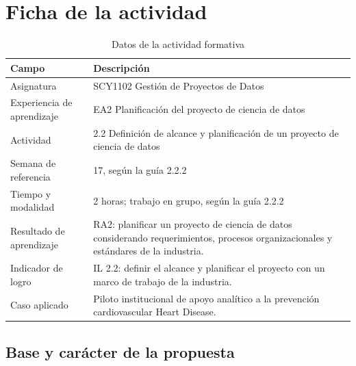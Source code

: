 \documentclass[12pt,a4paper]{article}
\begin{document}
\begin{center}\end{center}
\hypersetup{pageanchor=false}

\hypersetup{pageanchor=true}
\tableofcontents
\clearpage
{}

\section{Ficha de la actividad}

\begin{table}[H]
  \centering
  \caption{Datos de la actividad formativa}
  \small
  \begin{tabularx}{\textwidth}{@{}lX@{}}
    \toprule
    Campo & Descripción \\
    \midrule
    Asignatura & SCY1102 Gestión de Proyectos de Datos \\
    Experiencia de aprendizaje & EA2 Planificación del proyecto de ciencia de datos \\
    Actividad & 2.2 Definición de alcance y planificación de un proyecto de ciencia de datos \\
    Semana de referencia & 17, según la guía 2.2.2 \\
    Tiempo y modalidad & 2 horas; trabajo en grupo, según la guía 2.2.2 \\
    Resultado de aprendizaje & RA2: planificar un proyecto de ciencia de datos considerando requerimientos, procesos organizacionales y estándares de la industria. \\
    Indicador de logro & IL 2.2: definir el alcance y planificar el proyecto con un marco de trabajo de la industria. \\
    Caso aplicado & Piloto institucional de apoyo analítico a la prevención cardiovascular Heart Disease. \\
    \bottomrule
  \end{tabularx}
\end{table}

\subsection{Base y carácter de la propuesta}
\end{document}
